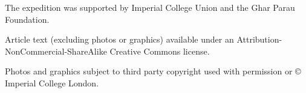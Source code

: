 The expedition was supported by Imperial College Union and the Ghar Parau Foundation.



Article text (excluding photos or graphics) available under an Attribution-NonCommercial-ShareAlike Creative Commons license.

Photos and graphics subject to third party copyright used with permission or © Imperial College London.








